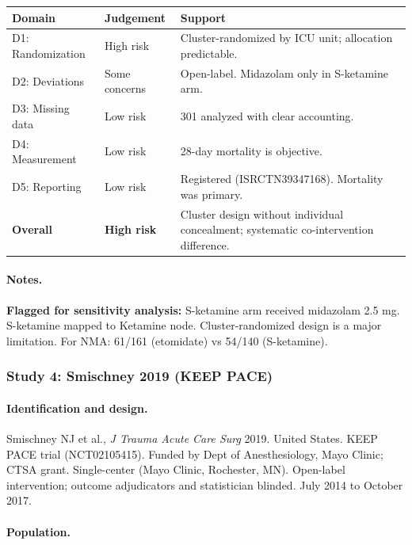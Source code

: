 \documentclass[11pt]{article}
\begin{document}
\begin{table}[H]
\centering\footnotesize
\begin{tabularx}{\textwidth}{L{3cm} C{2cm} X}
\toprule
\textbf{Domain} & \textbf{Judgement} & \textbf{Support} \\
\midrule
D1: Randomization & High risk & Cluster-randomized by ICU unit; allocation predictable. \\
D2: Deviations & Some concerns & Open-label. Midazolam only in S-ketamine arm. \\
D3: Missing data & Low risk & 301 analyzed with clear accounting. \\
D4: Measurement & Low risk & 28-day mortality is objective. \\
D5: Reporting & Low risk & Registered (ISRCTN39347168). Mortality was primary. \\
\textbf{Overall} & \textbf{High risk} & Cluster design without individual concealment; systematic co-intervention difference. \\
\bottomrule
\end{tabularx}
\end{table}

\paragraph{Notes.}
\textbf{Flagged for sensitivity analysis:} S-ketamine arm received midazolam 2.5 mg. S-ketamine mapped to Ketamine node. Cluster-randomized design is a major limitation. For NMA: 61/161 (etomidate) vs 54/140 (S-ketamine).

\bigskip

\subsubsection{Study 4: Smischney 2019 (KEEP PACE)}

\paragraph{Identification and design.}
Smischney NJ et al., \textit{J Trauma Acute Care Surg} 2019. United States. KEEP PACE trial (NCT02105415). Funded by Dept of Anesthesiology, Mayo Clinic; CTSA grant. Single-center (Mayo Clinic, Rochester, MN). Open-label intervention; outcome adjudicators and statistician blinded. July 2014 to October 2017.

\paragraph{Population.}
\end{document}

